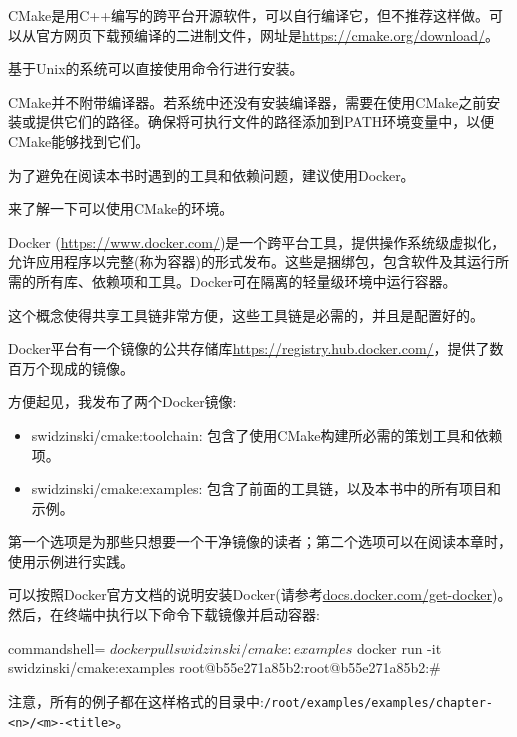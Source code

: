 
CMake是用C++编写的跨平台开源软件，可以自行编译它，但不推荐这样做。可以从官方网页下载预编译的二进制文件，网址是\url{https://cmake.org/download/}。

基于Unix的系统可以直接使用命令行进行安装。

\begin{tcolorbox}[colback=blue!5!white,colframe=blue!75!black,title=Note]
CMake并不附带编译器。若系统中还没有安装编译器，需要在使用CMake之前安装或提供它们的路径。确保将可执行文件的路径添加到PATH环境变量中，以便CMake能够找到它们。

为了避免在阅读本书时遇到的工具和依赖问题，建议使用Docker。
\end{tcolorbox}

来了解一下可以使用CMake的环境。


Docker (\url{https://www.docker.com/})是一个跨平台工具，提供操作系统级虚拟化，允许应用程序以完整(称为容器)的形式发布。这些是捆绑包，包含软件及其运行所需的所有库、依赖项和工具。Docker可在隔离的轻量级环境中运行容器。

这个概念使得共享工具链非常方便，这些工具链是必需的，并且是配置好的。

Docker平台有一个镜像的公共存储库\url{https://registry.hub.docker.com/}，提供了数百万个现成的镜像。

方便起见，我发布了两个Docker镜像:

\begin{itemize}
\item 
swidzinski/cmake:toolchain: 包含了使用CMake构建所必需的策划工具和依赖项。

\item 
swidzinski/cmake:examples: 包含了前面的工具链，以及本书中的所有项目和示例。
\end{itemize}

第一个选项是为那些只想要一个干净镜像的读者；第二个选项可以在阅读本章时，使用示例进行实践。

可以按照Docker官方文档的说明安装Docker(请参考\url{docs.docker.com/get-docker})。然后，在终端中执行以下命令下载镜像并启动容器:

\begin{tcblisting}{commandshell={}}
$ docker pull swidzinski/cmake:examples
$ docker run -it swidzinski/cmake:examples
root@b55e271a85b2:root@b55e271a85b2:#
\end{tcblisting}

注意，所有的例子都在这样格式的目录中:\texttt{/root/examples/examples/chapter-<n>/<m>-<title>}。

